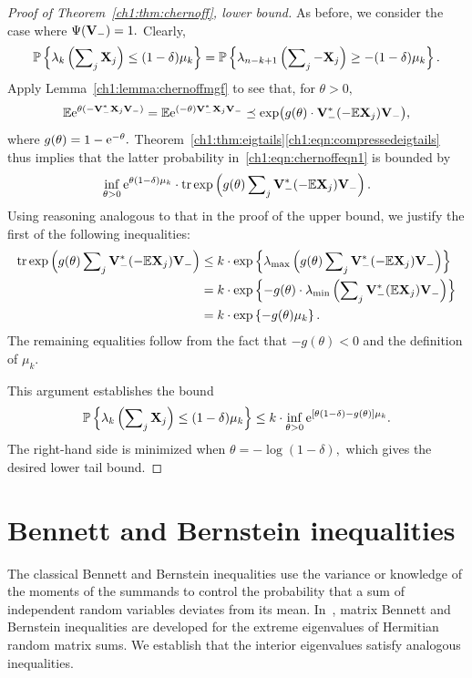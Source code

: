 \begin{proof}[Proof of Theorem~\ref{ch1:thm:chernoff}, lower bound]
As before, we consider the case where $\Psi(\mathbf{V}_{-}) = 1.$ Clearly,
\begin{equation}
 \mathbb{P}\left\{ \lambda_k\left(\sum\nolimits_j \mathbf{X}_j \right) \leq (1-\delta)\mu_k \right\}
= \mathbb{P}\left\{ \lambda_{n-k+1} \left(\sum\nolimits_j -\mathbf{X}_j \right) \geq
-(1-\delta)\mu_k \right\}.
 \label{ch1:eqn:chernoffeqn1}
\end{equation}
Apply Lemma~\ref{ch1:lemma:chernoffmgf} to see that, for $\theta > 0,$
\[
\mathbb{E} \mathrm{e}^{\theta (-\mathbf{V}^*_- \mathbf{X}_j \mathbf{V}_-)} = \mathbb{E}
\mathrm{e}^{(-\theta)\mathbf{V}^*_- \mathbf{X}_j \mathbf{V}_-} \preceq
\mathrm{exp}\big(g(\theta)\cdot \mathbf{V}^*_-(-\mathbb{E}\mathbf{X}_j)\mathbf{V}_-\big), 
\]
where $g(\theta) = 1-\mathrm{e}^{-\theta}.$  
Theorem~\ref{ch1:thm:eigtails}\eqref{ch1:eqn:compressedeigtails} thus implies that the
latter probability in~\eqref{ch1:eqn:chernoffeqn1} is bounded by
\[
  \inf_{\theta > 0} \mathrm{e}^{\theta(1-\delta)\mu_k}\cdot \operatorname{tr}\mathrm{exp}\left( g(\theta)
\sum\nolimits_j\mathbf{V}_{-}^* (- \mathbb{E}\mathbf{X}_j) \mathbf{V}_{-} \right).
\]
Using reasoning analogous to that in the proof of the upper bound, we justify
the first of the following inequalities:
\begin{align*}
\operatorname{tr}\mathrm{exp}\left( g(\theta) \sum\nolimits_j\mathbf{V}_{-}^* (-\mathbb{E} \mathbf{X}_j) \mathbf{V}_{-}\right)
& \leq k \cdot \mathrm{exp}\left\{ \lambda_{\mathrm{max}}\left( g(\theta) 
\sum\nolimits_j\mathbf{V}_{-}^* (-\mathbb{E} \mathbf{X}_j) \mathbf{V}_{-}\right) \right\} \\
& = k \cdot \mathrm{exp}\left\{ -g(\theta) \cdot \lambda_{\mathrm{min}}\left(\sum\nolimits_j
\mathbf{V}_{-}^* (\mathbb{E} \mathbf{X}_j) \mathbf{V}_{-}\right) \right\} \\
& = k \cdot \mathrm{exp}\left\{ -g(\theta) \mu_k \right\}.
\end{align*}
The remaining equalities follow from the fact that $-g(\theta) <0$ and the
definition of $\mu_k.$

This argument establishes the bound
\[
\mathbb{P}\left\{\lambda_k\left(\sum\nolimits_j \mathbf{X}_j \right) \leq (1 - \delta)\mu_k\right\}
\leq k \cdot \inf_{\theta > 0} \mathrm{e}^{[\theta(1 - \delta) - g(\theta)]\mu_k}.
\] 
The right-hand side is minimized when $\theta = -\log(1-\delta),$ which gives
the desired lower tail bound.
\end{proof}


\section{Bennett and Bernstein inequalities}
\label{ch1:sec:bernsteinbounds}

The classical Bennett and Bernstein inequalities use the variance or knowledge
of the moments of the summands to control the probability that a sum of
independent random variables deviates from its mean. In~\cite{T10a}, matrix
Bennett and Bernstein inequalities are developed for the extreme eigenvalues of
Hermitian random matrix sums. We establish that the interior eigenvalues
satisfy analogous inequalities.

